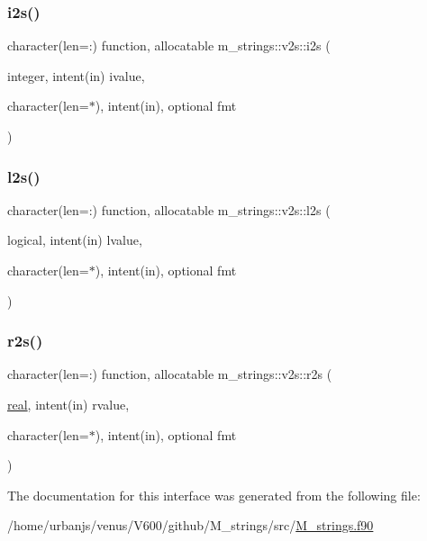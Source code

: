 \mbox{\label{interfacem__strings_1_1v2s_ae991f00bc56ef9caf798df25e74009b9}} 
\subsubsection{\texorpdfstring{i2s()}{i2s()}}
{\footnotesize\ttfamily character(len=\+:) function, allocatable m\+\_\+strings\+::v2s\+::i2s (\begin{DoxyParamCaption}\item[{integer, intent(in)}]{ivalue,  }\item[{character(len=$\ast$), intent(in), optional}]{fmt }\end{DoxyParamCaption})\hspace{0.3cm}{\ttfamily [private]}}

\mbox{\label{interfacem__strings_1_1v2s_a8bda20246f1ced2d83837937634bb3ca}} 
\subsubsection{\texorpdfstring{l2s()}{l2s()}}
{\footnotesize\ttfamily character(len=\+:) function, allocatable m\+\_\+strings\+::v2s\+::l2s (\begin{DoxyParamCaption}\item[{logical, intent(in)}]{lvalue,  }\item[{character(len=$\ast$), intent(in), optional}]{fmt }\end{DoxyParamCaption})\hspace{0.3cm}{\ttfamily [private]}}

\mbox{\label{interfacem__strings_1_1v2s_ad9e4275fa6b90c13b2c022c55338ce57}} 
\subsubsection{\texorpdfstring{r2s()}{r2s()}}
{\footnotesize\ttfamily character(len=\+:) function, allocatable m\+\_\+strings\+::v2s\+::r2s (\begin{DoxyParamCaption}\item[{\mbox{\hyperlink{interfacem__strings_1_1real}{real}}, intent(in)}]{rvalue,  }\item[{character(len=$\ast$), intent(in), optional}]{fmt }\end{DoxyParamCaption})\hspace{0.3cm}{\ttfamily [private]}}



The documentation for this interface was generated from the following file\+:\begin{DoxyCompactItemize}
\item 
/home/urbanjs/venus/\+V600/github/\+M\+\_\+strings/src/\mbox{\hyperlink{M__strings_8f90}{M\+\_\+strings.\+f90}}\end{DoxyCompactItemize}
